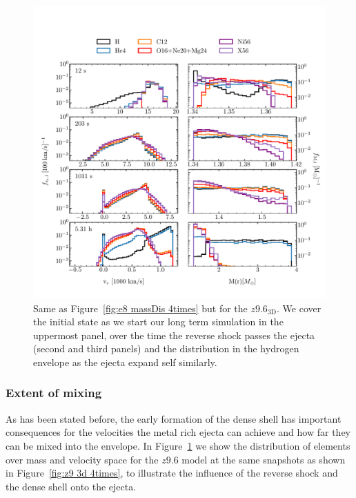 \documentclass[fleqn,usenatbib]{mnras}
\begin{document}
\begin{figure}
 \centering
 \includegraphics[width=\textwidth,trim=0cm 0.6cm 0cm 1cm,clip]{pic/z93_3d_massDis_mvr_mas_4times_paper.pdf}
 \caption{Same as Figure~\ref{fig:e8 massDis 4times} but for the $z9.6_{\mathrm{3D}}$. We cover the initial state as we start our long term simulation in the uppermost panel, over the time the reverse shock passes the ejecta (second and third panels) and the distribution in the hydrogen envelope as the ejecta expand self similarly.}
 \label{fig:z9 massDis}
\end{figure}

\subsubsection{Extent of mixing}
As has been stated before, the early formation of the dense shell has important consequences for the velocities the metal rich ejecta can achieve and how far they can be mixed into the envelope.
In Figure~\ref{fig:z9 massDis} we show the distribution of elements over mass and velocity space for the $z9.6$ model at the same snapshots as shown in Figure~\ref{fig:z9 3d  4times}, to illustrate the influence of the reverse shock and the dense shell onto the ejecta.
\end{document}
